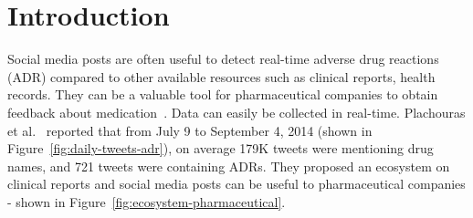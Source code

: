 \section{Introduction}

Social media posts are often useful to detect real-time adverse drug reactions (ADR) compared to other available resources such as clinical reports, health records. They can be a valuable tool for pharmaceutical companies to obtain feedback about medication~\cite{plachouras2016quantifying, huynh2016adverse}. Data can easily be collected in real-time. Plachouras et al.~\cite{plachouras2016quantifying} reported that from July 9 to September 4, 2014 (shown in Figure~\ref{fig:daily-tweets-adr}), on average 179K tweets were mentioning drug names, and 721 tweets were containing ADRs. They proposed an ecosystem on clinical reports and social media posts can be useful to pharmaceutical companies - shown in Figure~\ref{fig:ecosystem-pharmaceutical}.

